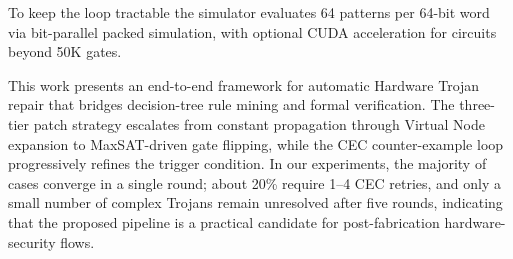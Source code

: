 \documentclass[a4paper,12pt]{article}
\begin{document}
\noindent To keep the loop tractable the simulator evaluates 64 patterns per 64-bit word via bit-parallel packed simulation, with optional CUDA acceleration for circuits beyond 50K gates.


\quad

This work presents an end-to-end framework for automatic Hardware Trojan repair that bridges decision-tree rule mining and formal verification. The three-tier patch strategy escalates from constant propagation through Virtual Node expansion to MaxSAT-driven gate flipping, while the CEC counter-example loop progressively refines the trigger condition. In our experiments, the majority of cases converge in a single round; about 20\% require 1--4 CEC retries, and only a small number of complex Trojans remain unresolved after five rounds, indicating that the proposed pipeline is a practical candidate for post-fabrication hardware-security flows.
\end{document}

